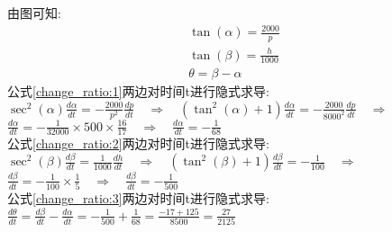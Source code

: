 \documentclass[UTF8, fontset=ubuntu, fleqn]{ctexart}
\begin{document}
由图可知:\\
\begin{gather}
\tan(\alpha)=\frac{2000}{p}\label{change_ratio:1}\\
\tan(\beta)=\frac{h}{1000}\label{change_ratio:2}\\
\theta=\beta-\alpha\label{change_ratio:3}
\end{gather}
公式\eqref{change_ratio:1}两边对时间t进行隐式求导:\\[1ex]
$\displaystyle\sec^2(\alpha)\frac{d\alpha}{dt}=-\frac{2000}{p^2}\frac{dp}{dt}\quad\Rightarrow\quad(\tan^2(\alpha)+1)\frac{d\alpha}{dt}=-\frac{2000}{8000^2}\frac{dp}{dt}\quad\Rightarrow$\\[1ex]
$\displaystyle\frac{d\alpha}{dt}=-\frac{1}{32000}\times 500\times\frac{16}{17}\quad\Rightarrow\quad\frac{d\alpha}{dt}=-\frac{1}{68}$\\[1ex]
公式\eqref{change_ratio:2}两边对时间t进行隐式求导:\\[1ex]
$\displaystyle\sec^2(\beta)\frac{d\beta}{dt}=\frac{1}{1000}\frac{dh}{dt}\quad\Rightarrow\quad(\tan^2(\beta)+1)\frac{d\beta}{dt}=-\frac{1}{100}\quad\Rightarrow$\\[1ex]
$\displaystyle\frac{d\beta}{dt}=-\frac{1}{100}\times\frac{1}{5}\quad\Rightarrow\quad\frac{d\beta}{dt}=-\frac{1}{500}$\\[1ex]
公式\eqref{change_ratio:3}两边对时间t进行隐式求导:\\[1ex]
$\displaystyle\frac{d\theta}{dt}=\frac{d\beta}{dt}-\frac{d\alpha}{dt}=-\frac{1}{500}+\frac{1}{68}=\frac{-17+125}{8500}=\frac{27}{2125}$\\[1ex]
\end{document}
